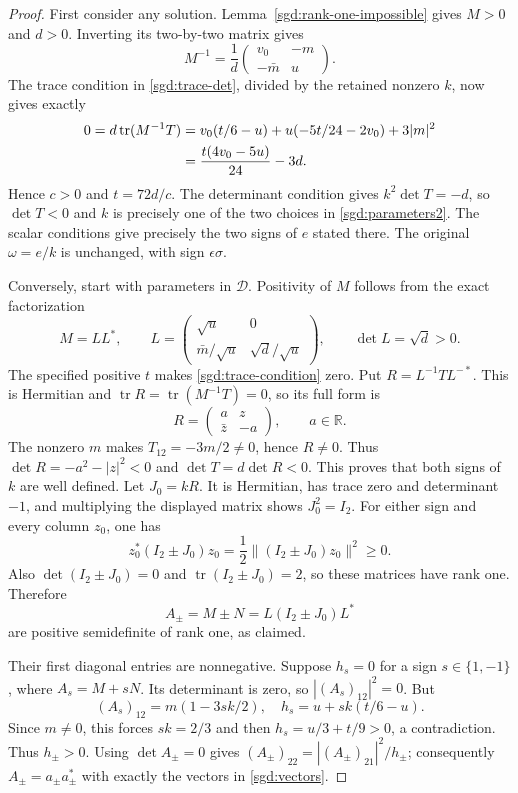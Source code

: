 \documentclass[11pt]{article}
\newcommand{\tr}{\operatorname{tr}}
\begin{document}
\begin{proof}
First consider any solution. Lemma~\ref{sgd:rank-one-impossible}
gives $M>0$ and $d>0$. Inverting its two-by-two matrix gives
\[
 M^{-1}=\frac1d\begin{pmatrix}v_0&-m\\-\bar m&u\end{pmatrix}.
\]
The trace condition in \eqref{sgd:trace-det}, divided by the retained
nonzero $k$, now gives exactly
\begin{align}
 0=d\tr(M^{-1}T)
 &=v_0(t/6-u)+u(-5t/24-2v_0)+3|m|^2\notag\\
 &=\frac{t(4v_0-5u)}{24}-3d.\label{sgd:trace-condition}
\end{align}
Hence $c>0$ and $t=72d/c$. The determinant condition gives
$k^2\det T=-d$, so $\det T<0$ and $k$ is precisely one of
the two choices in \eqref{sgd:parameters2}. The scalar conditions
give precisely the two signs of $e$ stated there. The original
$\omega=e/k$ is unchanged, with sign $\epsilon\sigma$.

Conversely, start with parameters in $\mathcal D$. Positivity of $M$
follows from the exact factorization
\[
 M=LL^*,\qquad
 L=\begin{pmatrix}\sqrt u&0\\\bar m/\sqrt u&\sqrt d/\sqrt u\end{pmatrix},
 \qquad \det L=\sqrt d>0.
\]
The specified positive $t$ makes \eqref{sgd:trace-condition} zero.
Put $R=L^{-1}TL^{-*}$. This is Hermitian and
$\tr R=\tr(M^{-1}T)=0$, so its full form is
\[
 R=\begin{pmatrix}a&z\\\bar z&-a\end{pmatrix},\qquad a\in\mathbb R.
\]
The nonzero $m$ makes $T_{12}=-3m/2\ne0$, hence $R\ne0$.
Thus $\det R=-a^2-|z|^2<0$ and $\det T=d\det R<0$.
This proves that both signs of $k$ are well defined. Let $J_0=kR$.
It is Hermitian, has trace zero and determinant $-1$, and multiplying
the displayed matrix shows $J_0^2=I_2$.
For either sign and every column $z_0$, one has
\[
 z_0^*(I_2\pm J_0)z_0=\frac12\|(I_2\pm J_0)z_0\|^2\ge0.
\]
Also $\det(I_2\pm J_0)=0$ and $\tr(I_2\pm J_0)=2$,
so these matrices have rank one. Therefore
\[
 A_\pm=M\pm N=L(I_2\pm J_0)L^*
\]
are positive semidefinite of rank one, as claimed.

Their first diagonal entries are nonnegative. Suppose $h_s=0$ for
a sign $s\in\{1,-1\}$, where $A_s=M+sN$. Its determinant is
zero, so $|(A_s)_{12}|^2=0$. But
\[
 (A_s)_{12}=m(1-3sk/2),\quad
 h_s=u+sk(t/6-u).
\]
Since $m\ne0$, this forces $sk=2/3$ and then
$h_s=u/3+t/9>0$, a contradiction. Thus $h_\pm>0$.
Using $\det A_\pm=0$ gives
$(A_\pm)_{22}=|(A_\pm)_{21}|^2/h_\pm$; consequently
$A_\pm=a_\pm a_\pm^*$ with exactly the vectors in
\eqref{sgd:vectors}.


\end{proof}
\end{document}
